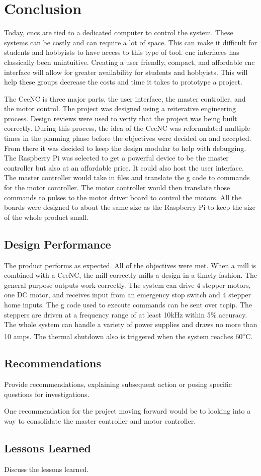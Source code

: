 \chapter{Conclusion}

Today, \gls{cnc}s are tied to a dedicated computer to control the system.
These systems can be costly and can require a lot of space.
This can make it difficult for students and hobbyists to have access to this type of tool.
\gls{cnc} interfaces has classically been unintuitive.
Creating a user friendly, compact, and affordable \gls{cnc} interface will allow for greater availability for students and hobbyists.
This will help these groups decrease the costs and time it takes to prototype a project.

The CeeNC is three major parts, the user interface, the master controller, and the motor control.
The project was designed using a reiterative engineering process.
Design reviews were used to verify that the project was being built correctly.
During this process, the idea of the CeeNC was reformulated multiple times in the planning phase before the objectives were decided on and accepted.
From there it was decided to keep the design modular to help with debugging.
The Raspberry Pi was selected to get a powerful device to be the master controller but also at an affordable price.
 It could also host the user interface.
The master controller would take in files and translate the g code to commands for the motor controller.
The motor controller would then translate those commands to pulses to the motor driver board to control the motors.
All the boards were designed to about the same size as the Raspberry Pi to keep the size of the whole product small.


\section{Design Performance}

The product performs as expected.
All of the objectives were met.
When a mill is combined with a CeeNC, the mill correctly mills a design in a timely fashion. 
The general purpose outputs work correctly.
The system can drive 4 stepper motors, one DC motor, and receives input from an emergency stop switch and 4 stepper home inputs.
The g code used to execute commands can be sent over \gls{tcpip}.
The steppers are driven at a frequency range of at least 10kHz within 5\% accuracy.
The whole system can handle a variety of power supplies and draws no more than 10 amps.
The thermal shutdown also is triggered when the system reaches 60\textsuperscript{o}C.
\section{Recommendations}
Provide recommendations, explaining subsequent action or posing specific questions for investigations. 

One recommendation for the project moving forward would be to looking into a way to consolidate the master controller and motor controller.

\section{Lessons Learned}
Discuss the lessons learned. 